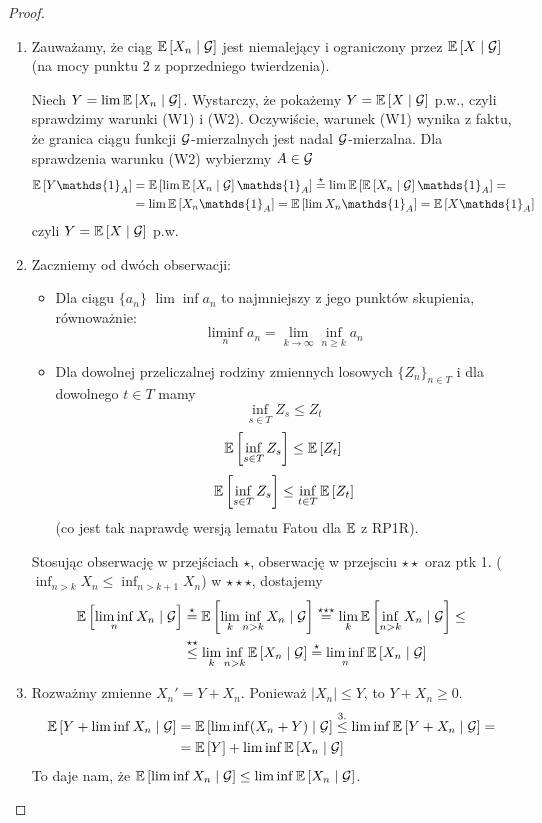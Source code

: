 \begin{proof}
  \begin{enumerate}
    \item Zauważamy, że ciąg $\expected{X_n}{\set{G}}$ jest niemalejący i ograniczony przez $\expected{X}{\set{G}}$ (na mocy punktu 2 z poprzedniego twierdzenia).

      Niech $Y=\lim\expected{X_n}{\set{G}}$. Wystarczy, że pokażemy $Y=\expected{X}{\set{G}}$ p.w., czyli sprawdzimy warunki (W1) i (W2). Oczywiście, warunek (W1) wynika z faktu, że granica ciągu funkcji $\mathcal{G}$-mierzalnych jest nadal $\mathcal{G}$-mierzalna. Dla sprawdzenia warunku (W2) wybierzmy $A\in\mathcal{G}$
      \begin{align*}
        \expected{Y\mathds{1}_A}&=\expected{\lim\expected{X_n}{\set{G}}\mathds{1}_A}\overset{\star}{=}\lim\expected{\expected{X_n}{\set{G}}\mathds{1}_A}=\\
                                &=\lim\expected{X_n\mathds{1}_A}=\expected{\lim X_n\mathds{1}_A}=\expected{X\mathds{1}_A}
      \end{align*}
      czyli $Y=\expected{X}{\set{G}}$ p.w.
    \item Zaczniemy od dwóch obserwacji:
      \begin{itemize}
        \item Dla ciągu $\{a_n\}$ $\lim\inf a_n$ to najmniejszy z jego punktów skupienia, równoważnie:
          $$\liminf_na_n=\lim_{k\to\infty}\inf_{n\geq k}a_n$$
        \item[{\color{green}\PHrosette}] Dla dowolnej przeliczalnej rodziny zmiennych losowych $\{Z_n\}_{n\in T}$ i dla dowolnego $t\in T$ mamy
          $$\inf_{s\in T}Z_s\leq Z_t$$
          $$\expected{\inf_{s\in T} Z_s}\leq\expected{Z_t}$$
          $$\expected{\inf_{s\in T} Z_s}\leq\inf_{t\in T}\expected{Z_t}$$
          (co jest tak naprawdę wersją lematu Fatou dla $\expected$ z RP1R).
      \end{itemize}
      Stosując obserwację \PHtunny w przejściach $\star$, obserwację \PHrosette w przejsciu $\star\star$ oraz ptk 1. ($\inf_{n>k}X_n\leq \inf_{n>k+1}X_n$) w $\star\star\star$, dostajemy
      \begin{align*}
        \expected{\liminf_n X_n}{\set{G}}&\overset{\star}{=}\expected{\lim_k\inf_{n>k}X_n}{\set{G}}\overset{\star\star\star}{=}\lim_k\expected{\inf_{n>k}X_n}{\set{G}}\leq\\
                                         &\overset{\star\star}{\leq}\lim_k\inf_{n>k}\expected{X_n}{\set{G}}\overset{\star}{=}\liminf_n\expected{X_n}{\set{G}}
      \end{align*}
    \item Rozważmy zmienne $X_n'=Y+X_n$. Ponieważ $|X_n|\leq Y$, to $Y+X_n\geq 0$.
      \begin{align*}
        \expected{Y+\liminf X_n}{\set{G}}&=\expected{\liminf(X_n+Y)}{\set{G}}\overset{3.}{\leq}\liminf\expected{Y+X_n}{\set{G}}=\\
                                         &=\expected{Y}+\liminf\expected{X_n}{\set{G}}
      \end{align*}
      To daje nam, że $\expected{\liminf X_n}{\set{G}}\leq\liminf\expected{X_n}{\set{G}}$.


\end{enumerate}
\end{proof}
